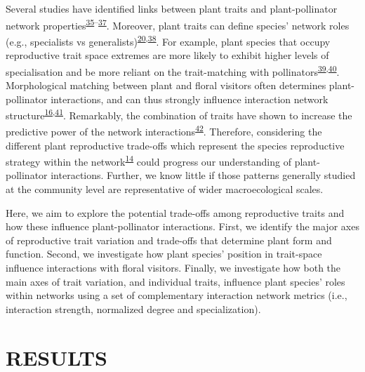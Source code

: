 \documentclass[
  12pt,
  a4paper,
]{article}
\begin{document}
Several studies have identified links between plant traits and plant-pollinator network properties\textsuperscript{\protect\hyperlink{ref-bartomeus2013}{35}--\protect\hyperlink{ref-rowe2020}{37}}. Moreover, plant traits can define species' network roles (e.g., specialists vs generalists)\textsuperscript{\protect\hyperlink{ref-tur2013}{20},\protect\hyperlink{ref-lazaro2013}{38}}. For example, plant species that occupy reproductive trait space extremes are more likely to exhibit higher levels of specialisation and be more reliant on the trait-matching with pollinators\textsuperscript{\protect\hyperlink{ref-junker2013}{39},\protect\hyperlink{ref-coux2016}{40}}. Morphological matching between plant and floral visitors often determines plant-pollinator interactions, and can thus strongly influence interaction network structure\textsuperscript{\protect\hyperlink{ref-stang2009}{16},\protect\hyperlink{ref-ibanez2012}{41}}. Remarkably, the combination of traits have shown to increase the predictive power of the network interactions\textsuperscript{\protect\hyperlink{ref-eklof2013}{42}}. Therefore, considering the different plant reproductive trade-offs which represent the species reproductive strategy within the network\textsuperscript{\protect\hyperlink{ref-dehling2016}{14}} could progress our understanding of plant-pollinator interactions. Further, we know little if those patterns generally studied at the community level are representative of wider macroecological scales.

Here, we aim to explore the potential trade-offs among reproductive traits and how these influence plant-pollinator interactions. First, we identify the major axes of reproductive trait variation and trade-offs that determine plant form and function. Second, we investigate how plant species' position in trait-space influence interactions with floral visitors. Finally, we investigate how both the main axes of trait variation, and individual traits, influence plant species' roles within networks using a set of complementary interaction network metrics (i.e., interaction strength, normalized degree and specialization).

\hypertarget{results}{%
\section{RESULTS}\label{results}}
\end{document}
